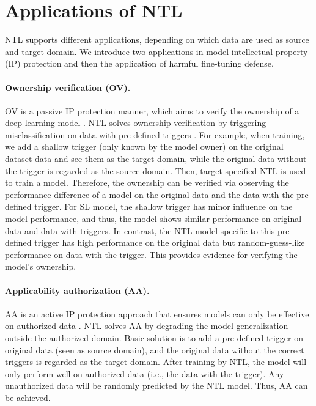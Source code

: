 \section{Applications of NTL}
\label{sec:applications}


NTL supports different applications, depending on which data are used as source and target domain. We introduce two applications in model intellectual property (IP) protection and then the application of harmful fine-tuning defense. 

\paragraph{Ownership verification (OV).} OV is a passive IP protection manner, which aims to verify the ownership of a deep learning model \cite{cheng2021mid,lederer2023identifying}. NTL solves ownership verification by triggering misclassification on data with pre-defined triggers \cite{wang2021non,chen2024mark,guo2024zeromark}. For example, when training, we add a shallow trigger (only known by the model owner) on the original dataset data and see them as the target domain, while the original data without the trigger is regarded as the source domain. Then, target-specified NTL is used to train a model. Therefore, the ownership can be verified via observing the performance difference of a model on the original data and the data with the pre-defined trigger. For SL model, the shallow trigger has minor influence on the model performance, and thus, the model shows similar performance on original data and data with triggers. In contrast, the NTL model specific to this pre-defined trigger has high performance on the original data but random-guess-like performance on data with the trigger. This provides evidence for verifying the model's ownership.
% 
\paragraph{Applicability authorization (AA).} AA is an active IP protection approach that ensures models can only be effective on authorized data \cite{wang2021non,xu2024idea,si2024iclguard}. NTL solves AA by degrading the model generalization outside the authorized domain. Basic solution is to add a pre-defined trigger on original data (seen as source domain), and the original data without the correct triggers is regarded as the target domain. After training by NTL, the model will only perform well on authorized data (i.e., the data with the trigger). Any unauthorized data will be randomly predicted by the NTL model. Thus, AA can be achieved.




